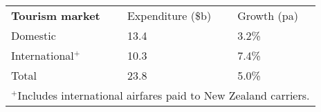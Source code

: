\begin{tabular}[t]{p{4.2cm}>{\hfill}p{1.9cm}>{\hfill}p{1.4cm}}
 \textbf{Tourism market} & Expenditure (\$b) & Growth (pa) \\ 
 Domestic & 13.4 & 3.2\% \\ 
  International$^+$ & 10.3 & 7.4\% \\ 
  Total & 23.8 & 5.0\% \\ 
  \multicolumn{3}{p{7.5cm}}{$^+$Includes international airfares paid to New Zealand carriers.}\ 
\end{tabular}
